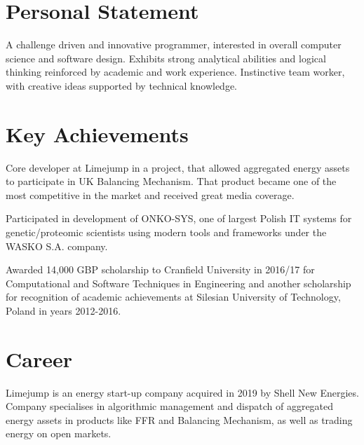 \documentclass[12pt,english]{resume}
\begin{document}

	\begin{center}
		
		
	\end{center}
	
	\section{Personal Statement}
		A challenge driven and innovative programmer, interested in overall computer
		science and software design. Exhibits strong analytical abilities and logical
		thinking reinforced by academic and work experience. Instinctive team worker,
		with creative ideas supported by technical knowledge.

	\section{Key Achievements}
		Core developer at Limejump in a project, that allowed aggregated energy assets to participate in UK Balancing Mechanism. That product became one of the most competitive in the market and received great media coverage.

		\noindent
		Participated in development of ONKO-SYS, one of largest Polish IT systems for genetic/proteomic scientists using modern tools and frameworks under the WASKO S.A. company.

		\noindent
		Awarded 14,000 GBP scholarship to Cranfield University in 2016/17 for Computational and Software Techniques in Engineering and another scholarship for recognition of academic achievements at Silesian University of Technology, Poland in years 2012-2016.

	\section{Career}

		Limejump is an energy start-up company acquired in 2019 by Shell New Energies. Company specialises in algorithmic management and dispatch of aggregated energy assets in products like FFR and Balancing Mechanism, as well as trading energy on open markets.
\end{document}

